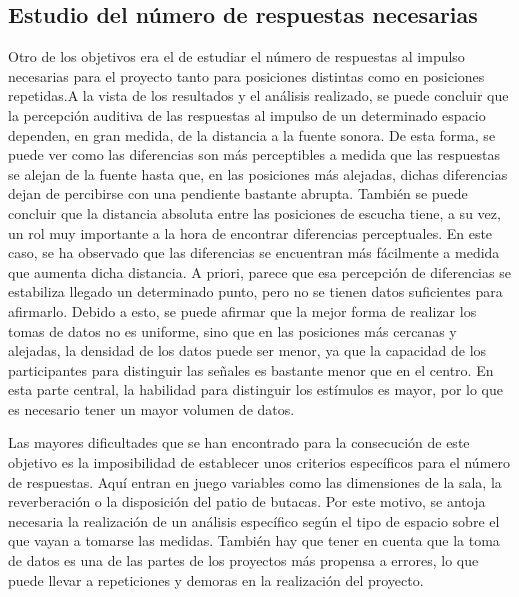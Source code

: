 \documentclass[11pt,a4paper]{book}
\begin{document}
        \subsection*{Estudio del número de respuestas necesarias}
            Otro de los objetivos era el de estudiar el número de respuestas al impulso necesarias para el proyecto tanto para posiciones distintas como en posiciones repetidas.A la vista de los resultados y el análisis realizado, se puede concluir que la percepción auditiva de las respuestas al impulso de un determinado espacio dependen, en gran medida, de la distancia a la fuente sonora. De esta forma, se puede ver como las diferencias son más perceptibles a medida que las respuestas se alejan de la fuente hasta que, en las posiciones más alejadas, dichas diferencias dejan de percibirse con una pendiente bastante abrupta. También se puede concluir que la distancia absoluta entre las posiciones de escucha tiene, a su vez, un rol muy importante a la hora de encontrar diferencias perceptuales. En este caso, se ha observado que las diferencias se encuentran más fácilmente a medida que aumenta dicha distancia. A priori, parece que esa percepción de diferencias se estabiliza llegado un determinado punto, pero no se tienen datos suficientes para afirmarlo. Debido a esto, se puede afirmar que la mejor forma de realizar los tomas de datos no es uniforme, sino que en las posiciones más cercanas y alejadas, la densidad de los datos puede ser menor, ya que la capacidad de los participantes para distinguir las señales es bastante menor que en el centro. En esta parte central, la habilidad para distinguir los estímulos es mayor, por lo que es necesario tener un mayor volumen de datos. 
    
            Las mayores dificultades que se han encontrado para la consecución de este objetivo es la imposibilidad de establecer unos criterios específicos para el número de respuestas. Aquí entran en juego variables como las dimensiones de la sala, la reverberación o la disposición del patio de butacas. Por este motivo, se antoja necesaria la realización de un análisis específico según el tipo de espacio sobre el que vayan a tomarse las medidas. También hay que tener en cuenta que la toma de datos es una de las partes de los proyectos más propensa a errores, lo que puede llevar a repeticiones y demoras en la realización del proyecto.
        
\end{document}
